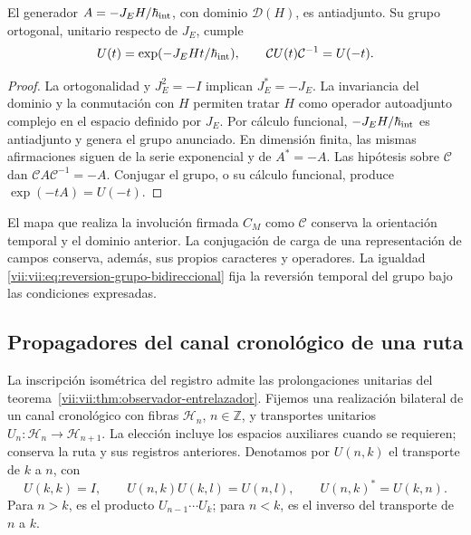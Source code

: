 \begin{theorem}
\label{vii:vii:thm:reversion-evolucion}
El generador \(A=-J_EH/\hbar_{\rm int}\), con dominio \(\mathcal D(H)\),
es antiadjunto. Su grupo ortogonal, unitario respecto de \(J_E\), cumple
\begin{equation}
 U(t)=\exp(-J_EHt/\hbar_{\rm int}),\qquad
 \mathcal C U(t)\mathcal C^{-1}=U(-t).
 \label{vii:vii:eq:reversion-grupo-bidireccional}
\end{equation}
\end{theorem}
\begin{proof}
La ortogonalidad y \(J_E^2=-I\) implican \(J_E^*=-J_E\).
La invariancia del dominio y la conmutación con \(H\) permiten tratar
\(H\) como operador autoadjunto complejo en el espacio definido por
\(J_E\). Por cálculo funcional, \(-J_EH/\hbar_{\rm int}\) es
antiadjunto y genera el grupo anunciado. En dimensión finita, las mismas
afirmaciones siguen de la serie exponencial y de \(A^*=-A\).
Las hipótesis sobre \(\mathcal C\) dan
\(\mathcal C A\mathcal C^{-1}=-A\). Conjugar el grupo, o su cálculo
funcional, produce \(\exp(-tA)=U(-t)\).
\end{proof}

El mapa que realiza la involución firmada \(C_M\) como \(\mathcal C\)
conserva la orientación temporal y el dominio anterior. La conjugación de
carga de una representación de campos conserva, además, sus propios
caracteres y operadores. La igualdad
\eqref{vii:vii:eq:reversion-grupo-bidireccional} fija la reversión temporal
del grupo bajo las condiciones expresadas.

\subsection{Propagadores del canal cronológico de una ruta}
\label{vii:vii:subsec:green-cronologico}

La inscripción isométrica del registro admite las prolongaciones unitarias
del teorema~\ref{vii:vii:thm:observador-entrelazador}. Fijemos una realización
bilateral de un canal cronológico con fibras \(\mathcal H_n\),
\(n\in\mathbb Z\), y transportes unitarios
\(U_n:\mathcal H_n\to\mathcal H_{n+1}\).
La elección incluye los espacios auxiliares cuando se requieren; conserva
la ruta y sus registros anteriores. Denotamos por \(U(n,k)\) el transporte
de \(k\) a \(n\), con
\[
 U(k,k)=I,\qquad U(n,k)U(k,l)=U(n,l),\qquad
 U(n,k)^*=U(k,n).
\]
Para \(n>k\), es el producto \(U_{n-1}\cdots U_k\); para \(n<k\),
es el inverso del transporte de \(n\) a \(k\).

